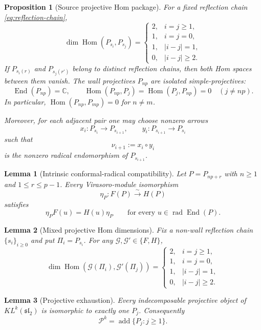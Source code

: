 \documentclass[10pt,a4paper]{amsart}
\newtheorem{prop}{Proposition}
\newtheorem{lem}{Lemma}
\def\C{\mathbb{C}}
\newcommand{\End}{\operatorname{End}}
\newcommand{\Hom}{\operatorname{Hom}}
\newcommand{\KL}{KL}
\newcommand{\rad}{\operatorname{rad}}
\begin{document}
\begin{prop}[Source projective Hom package]\label{prop:source-Hom-package}
For a fixed reflection chain \eqref{eq:reflection-chain},
\[
 \dim\Hom(P_{s_i},P_{s_j})=
 \begin{cases}
 2,&i=j\geq1,\\
 1,&i=j=0,\\
 1,&|i-j|=1,\\
 0,&|i-j|\geq2.
 \end{cases}
\]
If $P_{s_i(r)}$ and $P_{s_j(r')}$ belong to distinct reflection chains,
then both Hom spaces between them vanish.  The wall projectives $P_{np}$ are isolated
simple-projectives:
\[
 \End(P_{np})=\C,\qquad
 \Hom(P_{np},P_j)=\Hom(P_j,P_{np})=0\quad(j\ne np).
\]
In particular, $\Hom(P_{np},P_{mp})=0$ for $n\ne m$.

Moreover, for each adjacent pair one may choose nonzero arrows
\[
 x_i:P_{s_i}\longrightarrow P_{s_{i+1}},
 \qquad
 y_i:P_{s_{i+1}}\longrightarrow P_{s_i}
\]
such that
\begin{equation}\label{eq:source-zigzag-composition}
 \nu_{i+1}:=x_i\circ y_i
\end{equation}
is the nonzero radical endomorphism of $P_{s_{i+1}}$.
\end{prop}

\begin{lem}[Intrinsic conformal-radical compatibility]
\label{lem:twist-locking}
Let $P=P_{np+r}$ with $n\ge1$ and $1\le r\le p-1$.  Every
Virasoro-module isomorphism
\[
 \eta_P:F(P)\xrightarrow{\sim}H(P)
\]
satisfies
\begin{equation}\label{eq:twist-locking}
 \eta_PF(u)=H(u)\eta_P
 \qquad\text{for every }u\in\rad\End(P).
\end{equation}
\end{lem}

\begin{lem}[Mixed projective Hom dimensions]
\label{lem:mixed-projective-Hom}
Fix a non-wall reflection chain $\{s_i\}_{i\ge0}$ and put
$\Pi_i=P_{s_i}$.  For any $\mathscr G,\mathscr G'\in\{F,H\}$,
\[
 \dim\Hom(\mathscr G(\Pi_i),\mathscr G'(\Pi_j))
 =
 \begin{cases}
  2,&i=j\ge1,\\
  1,&i=j=0,\\
  1,&|i-j|=1,\\
  0,&|i-j|\ge2.
 \end{cases}
\]
\end{lem}

\begin{lem}[Projective exhaustion]\label{lem:projective-exhaustion}
Every indecomposable projective object of $\KL^k(\mathfrak{sl}_2)$ is
isomorphic to exactly one $P_j$.  Consequently
\[
 \mathcal P^k=\operatorname{add}\{P_j:j\ge1\}.
\]
\end{lem}
\end{document}
